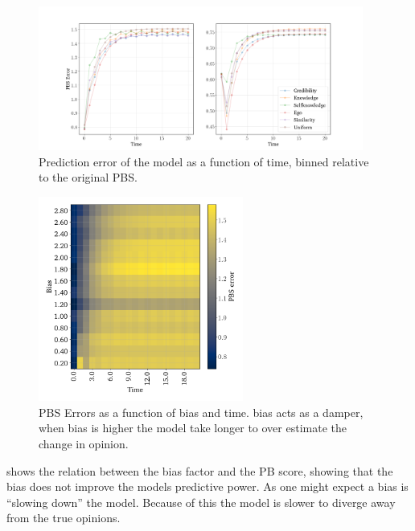 \documentclass[11pt, oneside, dvipsnames]{Thesis} %
\begin{document}
\begin{figure}
	\begin{center}
		\includegraphics[width=0.95\textwidth]{Figures/errors_binned.png}
	\end{center}
	\caption{Prediction error of the model as a function of time, binned relative to the original  PBS.}\label{fig:binned_errors}
\end{figure}


\begin{figure}
	\centering

	\includegraphics[width=0.6\textwidth]{Figures/bias_time_imshow.png}
	\hspace{1em}
	\caption{PBS Errors as a function of bias and time. bias acts as a damper, when bias is higher the model take longer to over estimate the change in opinion.}
	\label{fig:bias_slowdown}
\end{figure}

 shows the relation between the bias factor and the PB
score, showing that the bias does not improve the models predictive power. As
one might expect a bias is ``slowing down'' the model. Because of this the
model is slower to diverge away from the true opinions.
\end{document}
